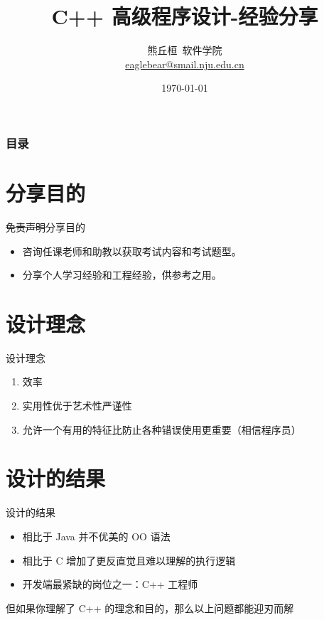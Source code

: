 \documentclass[10pt,aspectratio=169,mathserif]{beamer}
\title{C++ 高级程序设计-经验分享}
\author[熊丘桓]{
    熊丘桓\ 软件学院\\
  {\small \url{eaglebear@smail.nju.edu.cn}}}
\date{\today}
\begin{document}
\begin{frame}
    \titlepage
\end{frame}

\begin{frame}
    \frametitle{目录}
    \tableofcontents
\end{frame}

\section{分享目的}
\begin{frame}{\sout{免责声明}分享目的}
    \begin{itemize}
        \item 咨询任课老师和助教以获取考试内容和考试题型。
        \item 分享个人学习经验和工程经验，供参考之用。
    \end{itemize}
\end{frame}

\section{设计理念}
\begin{frame}{设计理念}
    \begin{enumerate}
        \def\labelenumi{\arabic{enumi}.}
        \item
              效率
        \item
              实用性优于艺术性严谨性
        \item
              允许一个有用的特征比防止各种错误使用更重要（相信程序员）
    \end{enumerate}
\end{frame}

\section{设计的结果}
\begin{frame}{设计的结果}
    \begin{itemize}
        \item
              相比于 Java 并不优美的 OO 语法
        \item
              相比于 C 增加了更反直觉且难以理解的执行逻辑
        \item
              开发端最紧缺的岗位之一：C++ 工程师
    \end{itemize}

    但如果你理解了 C++ 的理念和目的，那么以上问题都能迎刃而解

\end{frame}
\end{document}
